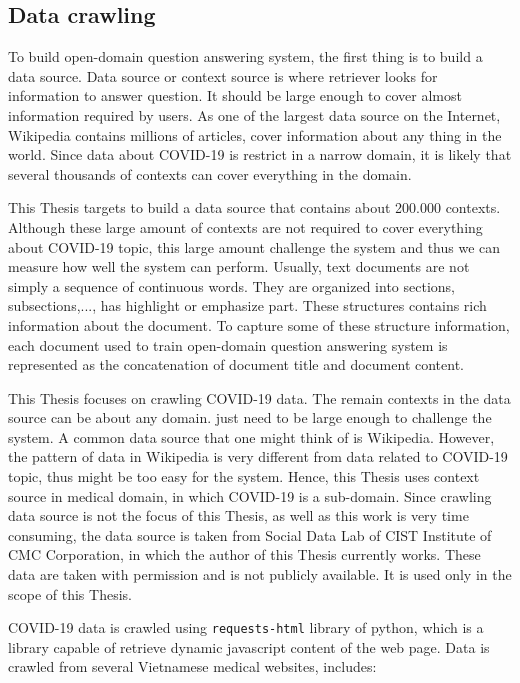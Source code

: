 \documentclass[3p, sort&compress, 12pt]{elsarticle}
\begin{document}
\subsection{Data crawling}
To build open-domain question answering system, the first thing is to build a data source. Data source or context source is where retriever looks for information to answer question. It should be large enough to cover almost information required by users. As one of the largest data source on the Internet, Wikipedia contains millions of articles, cover information about any thing in the world. Since data about COVID-19 is restrict in a narrow domain, it is likely that several thousands of contexts can cover everything in the domain.
\par 
\par This Thesis targets to build a data source that contains about 200.000 contexts. Although these large amount of contexts are not required to cover everything about COVID-19 topic, this large amount challenge the system and thus we can measure how well the system can perform. Usually, text documents are not simply a sequence of continuous words. They are organized into sections, subsections,..., has highlight or emphasize part. These structures contains rich information about the document. To capture some of these structure information, each document used to train open-domain question answering system is represented as the concatenation of document title and document content.
\par This Thesis focuses on crawling COVID-19 data. The remain contexts in the data source can be about any domain. just need to be large enough to challenge the system. A common data source that one might think of is Wikipedia. However, the pattern of data in Wikipedia is very different from data related to COVID-19 topic, thus might be too easy for the system. Hence, this Thesis uses context source in medical domain, in which COVID-19 is a sub-domain. Since crawling data source is not the focus of this Thesis, as well as this work is very time consuming, the data source is taken from Social Data Lab of CIST Institute of CMC Corporation, in which the author of this Thesis currently works. These data are taken with permission and is not publicly available. It is used only in the scope of this Thesis.
\par COVID-19 data is crawled using {\tt requests-html} library of python, which is a library capable of retrieve dynamic javascript content of the web page. Data is crawled from several Vietnamese medical websites, includes:
\end{document}
